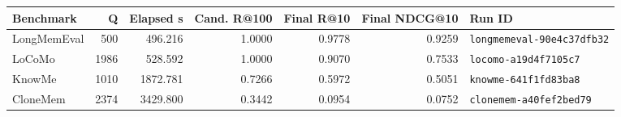 \begin{tabularx}{\textwidth}{lrrrrrl}
\toprule
Benchmark & Q & Elapsed s & Cand. R@100 & Final R@10 & Final NDCG@10 & Run ID \\
\midrule
LongMemEval & 500 & 496.216 & 1.0000 & 0.9778 & 0.9259 & \texttt{longmemeval-90e4c37dfb32} \\
LoCoMo & 1986 & 528.592 & 1.0000 & 0.9070 & 0.7533 & \texttt{locomo-a19d4f7105c7} \\
KnowMe & 1010 & 1872.781 & 0.7266 & 0.5972 & 0.5051 & \texttt{knowme-641f1fd83ba8} \\
CloneMem & 2374 & 3429.800 & 0.3442 & 0.0954 & 0.0752 & \texttt{clonemem-a40fef2bed79} \\
\bottomrule
\end{tabularx}
